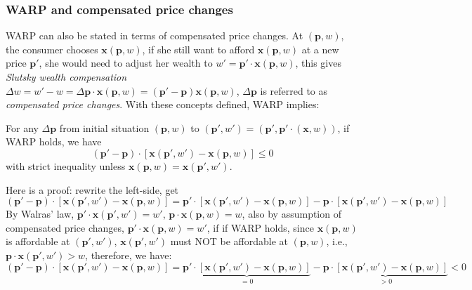 \subsubsection*{WARP and compensated price changes}
WARP can also be stated in terms of compensated price changes. At $(\mathbf{p},w)$, the consumer chooses $\mathbf{x}(\mathbf{p},w)$, if she still want to afford $\mathbf{x}(\mathbf{p},w)$ at a new price $\mathbf{p}'$, she would need to adjust her wealth to $w'=\mathbf{p}'\cdot \mathbf{x}(\mathbf{p},w)$, this gives \textit{Slutsky wealth compensation} $\Delta w=w'-w=\Delta \mathbf{p}\cdot\mathbf{x}(\mathbf{p},w)=(\mathbf{p}'-\mathbf{p})\mathbf{x}(\mathbf{p},w)$, $\Delta \mathbf{p}$ is referred to as \textit{compensated price changes}. With these concepts defined, WARP implies:
\begin{theorem}\label{thm_WARP_to_lawofdemand}
    For any $\Delta \mathbf{p}$ from initial situation $(\mathbf{p},w)$ to $(\mathbf{p}',w')=(\mathbf{p}',\mathbf{p}'\cdot(\mathbf{x},w))$, if WARP holds, we have
    $$(\mathbf{p}'-\mathbf{p})\cdot[\mathbf{x}(\mathbf{p}',w')-\mathbf{x}(\mathbf{p},w)]\leq 0$$
    with strict inequality unless $\mathbf{x}(\mathbf{p},w)=\mathbf{x}(\mathbf{p}',w')$.
\end{theorem}

Here is a proof: rewrite the left-side, get
$$(\mathbf{p}'-\mathbf{p})\cdot[\mathbf{x}(\mathbf{p}',w')-\mathbf{x}(\mathbf{p},w)]=\mathbf{p}'\cdot[\mathbf{x}(\mathbf{p}',w')-\mathbf{x}(\mathbf{p},w)]-\mathbf{p}\cdot[\mathbf{x}(\mathbf{p}',w')-\mathbf{x}(\mathbf{p},w)]$$
By Walras' law, $\mathbf{p}'\cdot\mathbf{x}(\mathbf{p}',w')=w'$, $\mathbf{p}\cdot \mathbf{x}(\mathbf{p},w)=w$, also by assumption of compensated price changes, $\mathbf{p}'\cdot\mathbf{x}(\mathbf{p},w)=w'$, if if WARP holds, since $\mathbf{x}(\mathbf{p},w)$ is affordable at $(\mathbf{p}',w')$, $\mathbf{x}(\mathbf{p}',w')$ must NOT be affordable at $(\mathbf{p},w)$, i.e., $\mathbf{p}\cdot \mathbf{x}(\mathbf{p}',w')>w$, therefore, we have:
$$(\mathbf{p}'-\mathbf{p})\cdot[\mathbf{x}(\mathbf{p}',w')-\mathbf{x}(\mathbf{p},w)]= \underbrace{\mathbf{p}'\cdot[\mathbf{x}(\mathbf{p}',w')-\mathbf{x}(\mathbf{p},w)]}_{=0} - \underbrace{\mathbf{p}\cdot[\mathbf{x}(\mathbf{p}',w')-\mathbf{x}(\mathbf{p},w)]}_{>0}<0$$

